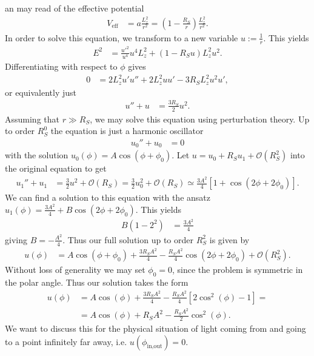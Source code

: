 \documentclass[english, parskip=full]{scrartcl}
\newcommand{\kla}{}
\newcommand{\klam}{}
\newcommand{\tecxt}{}
\begin{document}
an may read of the effective potential
\begin{align}
V_\tecxt\text{eff} &= a\frac{L_z^2}{r^2} = \kla\left( 1 - \frac{R_S}{r} \right) \frac{L_z^2}{r^2}.
\end{align}
In order to solve this equation, we transform to a new variable $u := \frac{1}{r}$.
This yields
\begin{align}
E^2 &= \frac{u'^2}{u^4} u^4 L_z^2 + (1 - R_Su) L_z^2u^2.
\end{align}
Differentiating with respect to $\phi$ gives
\begin{align}
0 &= 2L_z^2 u'u'' + 2L_z^2 uu' - 3R_SL_z^2 u^2u',
\end{align}
or equivalently just
\begin{align}
u'' + u &= \frac{3R_S}{2} u^2.
\end{align}
Assuming that $r\gg R_S$, we may solve this equation using perturbation theory.
Up to order $R_S^0$ the equation is just a harmonic oscillator
\begin{align}
u_0'' + u_0 &= 0
\end{align}
with the solution $u_0(\phi) = A\cos (\phi + \phi_0)$.
Let $u=u_0 + R_Su_1 + \mathcal{O}(R_S^2)$ into the original equation to get
\begin{align}
u_1''+u_1 &= \frac{3}{2} u^2 + \mathcal{O}(R_S) = \frac{3}{2} u_0^2 + \mathcal{O}(R_S) \simeq \frac{3A^2}{4} \klam\left[ 1 + \cos (2\phi + 2\phi_0) \right].
\end{align}
We can find a solution to this equation with the ansatz $u_1(\phi) = \frac{3A^2}{4} + B\cos(2\phi + 2\phi_0)$.
This yields
\begin{align}
B ( 1 - 2^2) &= \frac{3A^2}{4}
\end{align}
giving $B = -\frac{A^2}{4}$.
Thus our full solution up to order $R_S^2$ is given by
\begin{align}
u(\phi) &= A\cos(\phi + \phi_0) + \frac{3R_SA^2}{4} - \frac{R_SA^2}{4} \cos (2\phi + 2\phi_0) + \mathcal{O}(R_S^2).
\end{align}
Without loss of generality we may set $\phi_0 = 0$, since the problem is symmetric in the polar angle.
Thus our solution takes the form
\begin{align}
u(\phi) &= A\cos(\phi) + \frac{3R_SA^2}{4} - \frac{R_SA^2}{4} \klam\left[ 2\cos^2(\phi) - 1 \right] = \\
&= A\cos(\phi) + R_SA^2 - \frac{R_SA^2}{2}\cos^2(\phi).
\end{align}
We want to discuss this for the physical situation of light coming from and going to a point infinitely far away, i.e. $u(\phi_\tecxt\text{in,out}) = 0$.
\end{document}
